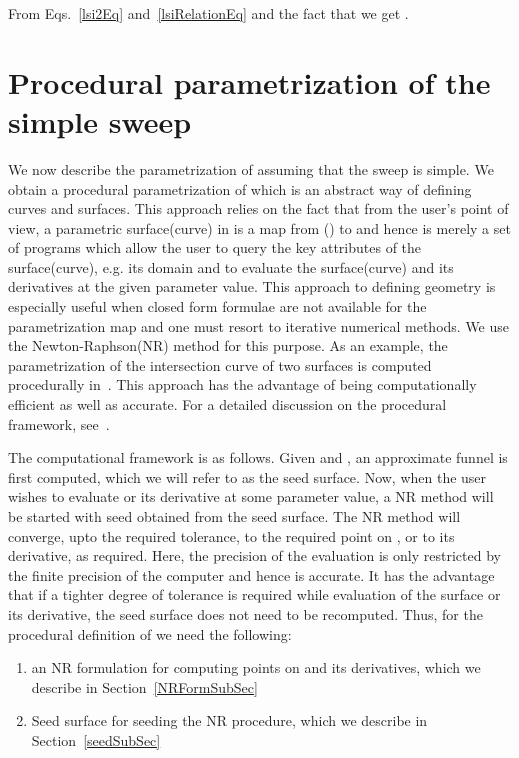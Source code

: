 \documentclass{elsart5p}
\begin{document}
From Eqs.~\ref{lsi2Eq} and~\ref{lsiRelationEq} and the fact that  we get 
.
\hfill 

\section{Procedural parametrization of the simple sweep} \label{proceduralSec}

We now describe the parametrization of  assuming that the sweep  is simple. 
We obtain a procedural parametrization of  which is an abstract way of defining curves and surfaces. 
This approach relies on the fact that from the user's point of view, a parametric surface(curve) in  
is a map from () to  and hence is merely a set of programs 
which allow the user to query the key attributes of the surface(curve), e.g. its domain and to evaluate the 
surface(curve) and its derivatives at the given parameter value.  This approach to defining geometry is especially 
useful when closed form formulae are not available for the parametrization map and one must resort to iterative 
numerical methods.  We use the Newton-Raphson(NR) method for this purpose.  As an example, the parametrization 
of the intersection curve of two surfaces is computed procedurally in~\cite{procedural}.  This approach has the 
advantage of being computationally efficient as well as accurate.  For a detailed discussion on the procedural framework, 
see~\cite{sohoni}.

The computational framework is as follows.  Given  and , an approximate funnel is first computed, 
which we will refer to as the seed surface.  Now, when the user wishes to evaluate  or its derivative at some parameter value,  
a NR method will be started with seed obtained from the seed surface.  The NR method will converge, upto the required tolerance, to the required 
point on , or to its derivative, as required.  Here, the precision of the evaluation is only restricted by the finite precision of the computer
 and hence is accurate.  It has the advantage that if a tighter degree of tolerance is required while evaluation of the surface or its derivative, the seed 
surface does not need to be recomputed.  Thus, for the procedural definition of  we need the following:
\begin{enumerate}
\item an NR formulation for computing points on  and its derivatives, which we describe in Section~\ref{NRFormSubSec}
\item Seed surface for seeding the NR procedure, which we describe in Section~\ref{seedSubSec}
\end{enumerate}
\end{document}
